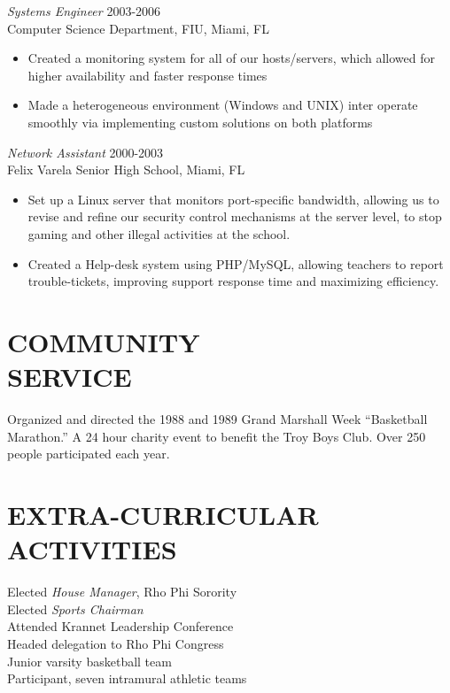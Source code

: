 \documentclass[margin]{res}
\begin{document}
\begin{resume}
  {\sl Systems Engineer} \hfill            2003-2006 \\
  Computer Science Department, FIU, Miami, FL
  \begin{itemize}  \itemsep -2pt %
  \item Created a monitoring system for all of our hosts/servers, which allowed
    for higher availability and faster response times
  \item Made a heterogeneous environment (Windows and UNIX) inter
    operate smoothly via implementing custom solutions on both platforms
  \end{itemize} 
  
  {\sl Network Assistant} \hfill        2000-2003 \\
  Felix Varela Senior High School, Miami, FL
  \begin{itemize}  \itemsep -2pt %
  \item Set up a Linux server that monitors port-specific bandwidth, allowing
    us to revise and refine our security control mechanisms at the server
    level, to stop gaming and other illegal activities at the school.
  \item Created a Help-desk system using PHP/MySQL, allowing teachers to
    report trouble-tickets, improving support response time and maximizing
    efficiency.
  \end{itemize} 
  
  \section{COMMUNITY \\ SERVICE}  Organized and directed the 1988 and 1989 Grand 
  Marshall Week \newline ``Basketball Marathon.'' A 24 hour 
  charity event to benefit the Troy Boys Club. Over 
  250 people participated each year. 
  
  \section{EXTRA-CURRICULAR \\ ACTIVITIES}             
  Elected {\it House Manager}, Rho Phi Sorority \\
  Elected {\it Sports Chairman} \\
  Attended Krannet Leadership Conference \\
  Headed delegation to Rho Phi Congress \\
  Junior varsity basketball team \\
  Participant, seven intramural athletic teams 
  
  
 \end{resume}
\end{document}
